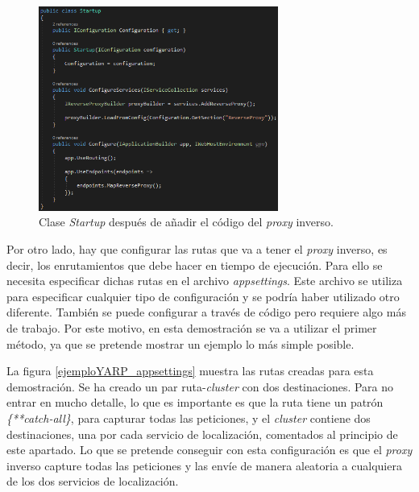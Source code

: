 \documentclass[11pt,spanish,listoffigures]{tfgetsinf}
\begin{document}
\begin{figure}[ht]
\centering
\includegraphics[width=0.7\textwidth]{imagenes/ejemploYARP/startup}
\caption{Clase \emph{Startup} después de añadir el código del \emph{proxy} inverso.}
	\label{ejemploYARP_startup}
\end{figure}

Por otro lado, hay que configurar las rutas que va a tener el \emph{proxy} inverso, es decir, los enrutamientos que debe hacer en tiempo de ejecución. Para ello se necesita especificar dichas rutas en el archivo \emph{appsettings}. Este archivo se utiliza para especificar cualquier tipo de configuración y se podría haber utilizado otro diferente. También se puede configurar a través de código pero requiere algo más de trabajo. Por este motivo, en esta demostración se va a utilizar el primer método, ya que se pretende mostrar un ejemplo lo más simple posible.

La figura \ref{ejemploYARP_appsettings} muestra las rutas creadas para esta demostración. Se ha creado un par ruta-\emph{cluster} con dos destinaciones. Para no entrar en mucho detalle, lo que es importante es que la ruta tiene un patrón \emph{\{**catch-all\}}, para capturar todas las peticiones, y el \emph{cluster} contiene dos destinaciones, una por cada servicio de localización, comentados al principio de este apartado. Lo que se pretende conseguir con esta configuración es que el \emph{proxy} inverso capture todas las peticiones y las envíe de manera aleatoria a cualquiera de los dos servicios de localización.
\end{document}
